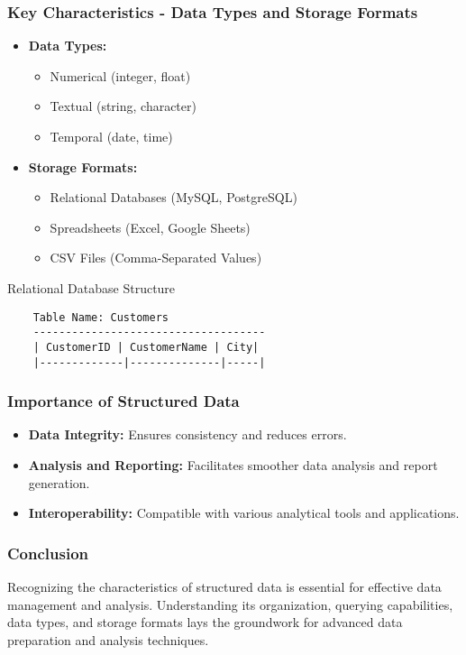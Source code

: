 \documentclass{beamer}
\begin{document}
\begin{frame}
    \frametitle{Key Characteristics - Data Types and Storage Formats}
    \begin{itemize}
        \item \textbf{Data Types:}
            \begin{itemize}
                \item Numerical (integer, float)
                \item Textual (string, character)
                \item Temporal (date, time)
            \end{itemize}
        \item \textbf{Storage Formats:}
            \begin{itemize}
                \item Relational Databases (MySQL, PostgreSQL)
                \item Spreadsheets (Excel, Google Sheets)
                \item CSV Files (Comma-Separated Values)
            \end{itemize}
    \end{itemize}
    \begin{block}{Relational Database Structure}
    \begin{verbatim}
    Table Name: Customers
    ------------------------------------
    | CustomerID | CustomerName | City|
    |-------------|--------------|-----|
    \end{verbatim}
    \end{block}
\end{frame}

\begin{frame}
    \frametitle{Importance of Structured Data}
    \begin{itemize}
        \item \textbf{Data Integrity:} Ensures consistency and reduces errors.
        \item \textbf{Analysis and Reporting:} Facilitates smoother data analysis and report generation.
        \item \textbf{Interoperability:} Compatible with various analytical tools and applications.
    \end{itemize}
\end{frame}

\begin{frame}
    \frametitle{Conclusion}
    Recognizing the characteristics of structured data is essential for effective data management and analysis. Understanding its organization, querying capabilities, data types, and storage formats lays the groundwork for advanced data preparation and analysis techniques.
\end{frame}
\end{document}
